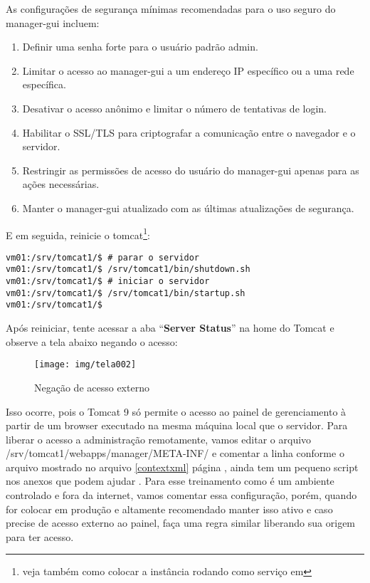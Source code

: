 As configurações de segurança mínimas recomendadas para o uso seguro do manager-gui incluem:

\begin{enumerate}
	\item Definir uma senha forte para o usuário padrão admin.
	\item Limitar o acesso ao manager-gui a um endereço IP específico ou a uma rede específica.
	\item Desativar o acesso anônimo e limitar o número de tentativas de login.
	\item Habilitar o SSL/TLS para criptografar a comunicação entre o navegador e o servidor.
	\item Restringir as permissões de acesso do usuário do manager-gui apenas para as ações necessárias.
	\item Manter o manager-gui atualizado com as últimas atualizações de segurança.
\end{enumerate}

E em seguida, reinicie o tomcat\footnote{veja também como colocar a instância rodando como serviço em }:

\begin{lstlisting}[breaklines=true,basicstyle=\ttfamily, 
label=restartTomcat,
breaklines=true,caption=\firacoderetina Iniciar e Parar tomcat manualmente,
postbreak=\mbox{\textcolor{red}{$\hookrightarrow$}\space},
showstringspaces=false]
vm01:/srv/tomcat1/$ # parar o servidor	
vm01:/srv/tomcat1/$ /srv/tomcat1/bin/shutdown.sh
vm01:/srv/tomcat1/$ # iniciar o servidor
vm01:/srv/tomcat1/$ /srv/tomcat1/bin/startup.sh
vm01:/srv/tomcat1/$ 
\end{lstlisting}

Após reiniciar, tente acessar a aba “\textbf{Server Status}” na home do Tomcat e observe a tela abaixo negando o acesso:

\begin{figure}[H]
	\centering
	\caption[Negacao de acesso]{Negação de acesso externo}
	\texttt{[image: img/tela002]}
	\label{fig:tomcat-erro-acesso}
\end{figure}

Isso ocorre, pois o Tomcat 9 só permite o acesso ao painel de gerenciamento à partir de um browser executado na mesma máquina local que o servidor. Para liberar o acesso a administração remotamente, vamos editar o arquivo /srv/tomcat1/webapps/manager/META-INF/ e comentar a linha conforme o arquivo mostrado no arquivo \ref{contextxml} página \pageref{contextxml}, ainda tem um pequeno script nos anexos que podem ajudar . Para esse treinamento como é um ambiente controlado e fora da internet, vamos comentar essa configuração, porém, quando for colocar em produção e altamente recomendado manter isso ativo e caso precise de acesso externo ao painel, faça uma regra similar liberando sua origem para ter acesso.
 
